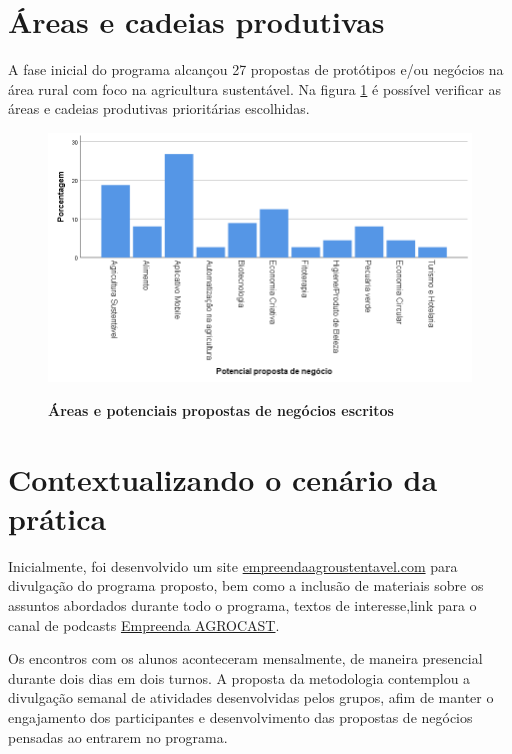 \section{Áreas e cadeias produtivas}

A fase inicial do programa alcançou 27 propostas de protótipos e/ou negócios na área rural com foco na agricultura sustentável. Na figura \ref{figura_11} é possível verificar as áreas e cadeias produtivas prioritárias escolhidas.

\begin{figure}[!htb]
\centering
\caption{\textbf{Áreas e potenciais propostas de negócios escritos}}
\includegraphics[scale=0.5]{Imagens/propostas_negocios.png}
\label{figura_11}
\end{figure}




\section{Contextualizando o cenário da prática}

Inicialmente, foi desenvolvido um site \href{http://www.empreendaagrosustentavel.com}{empreendaagroustentavel.com} para divulgação do programa proposto, bem como a inclusão de materiais sobre os assuntos abordados durante todo o programa, textos de interesse,link para o canal de podcasts \href{https://open.spotify.com/show/3c25hRSxvaCFPw6Y3lX3i1?si=9H_fGz_uRgGiFNhAcdr4rQ}{Empreenda AGROCAST}.

Os encontros com os alunos aconteceram mensalmente, de maneira presencial durante dois dias em dois turnos. A proposta da metodologia contemplou a divulgação semanal de atividades desenvolvidas pelos grupos, afim de manter o engajamento dos participantes e desenvolvimento das propostas de negócios pensadas ao entrarem no programa. 

